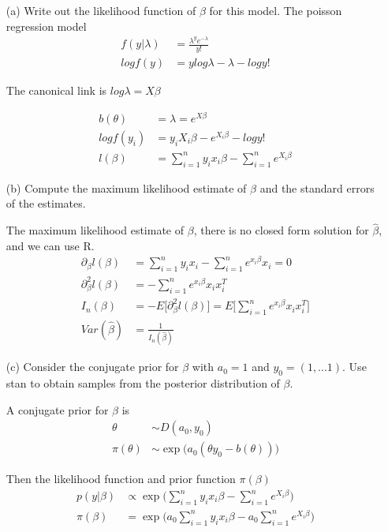\begin{itemize}
\item[(a)] Write out the likelihood function of $\beta$ for this model. 
The poisson regression model
\begin{align*}
f(y|\lambda) &= \frac{\lambda^y e^{-\lambda}}{y!} \\
log f(y) &=y log \lambda  - \lambda - log y!
\end{align*}

The canonical link is $ log \lambda=  X\beta$

\begin{align*}
b(\theta) &= \lambda = e^{X \beta} \\
log f(y_i) &= y_i X_i \beta -  e^{X_i \beta}  - log y! \\
l(\beta) &= \sum_{i=1}^n y_i x_i \beta - \sum_{i=1}^n e^{X_i \beta}
\end{align*}

\item[(b)] Compute the maximum likelihood estimate of $\beta$ and the standard errors of the estimates. 

The maximum likelihood estimate of $\beta$, there is no closed form solution for $\hat{\beta}$, and we can use R.
\begin{align*}
\partial_{\beta} l(\beta) &= \sum_{i=1}^n y_i x_i  - \sum_{i=1}^n e^{x_i \beta} x_i  = 0 \\
\partial_{\beta}^2 l(\beta) &= - \sum_{i=1}^n e^{x_i \beta} x_i x_i^T \\
I_n(\beta) &= - E \big[ \partial_{\beta}^2 l(\beta) \big] = E \big[\sum_{i=1}^n e^{x_i \beta} x_i x_i^T \big] \\
Var(\hat{\beta}) &= \frac{1}{I_n(\hat{\beta})}
\end{align*}

\item[(c)] Consider the conjugate prior for $\beta$ with $a_0 = 1$ and $y_0 = (1,...1)$. Use stan to obtain samples from the posterior distribution of $\beta$. 

A conjugate prior for $\beta$ is 
\begin{align*}
\theta & \sim D(a_0, y_0) \\
\pi(\theta) & \sim \exp \big( a_0 (\theta y_0 - b(\theta)) \big) 
\end{align*}

Then the likelihood function and prior function $\pi(\beta)$
\begin{align*}
p(y| \beta) & \propto \exp \big( \sum_{i=1}^n y_i x_i \beta - \sum_{i=1}^n e^{X_i \beta} \big) \\
\pi(\beta) &= \exp \big(a_0 \sum_{i=1}^n y_i x_i \beta - a_0 \sum_{i=1}^n e^{X_i \beta} \big) 
\end{align*}



\end{itemize}
